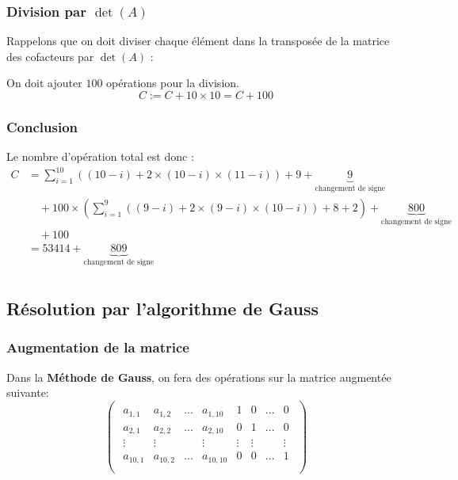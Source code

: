 \documentclass{article}
\begin{document}
\subsubsection{Division par $\det(A)$}

Rappelons que on doit diviser chaque élément dans la transposée de la matrice des cofacteurs par $\det(A)$ :

\begin{tcolorbox}
    On doit ajouter $100$ opérations pour la division.
\[
C := C + 10 \times 10 = C + 100
\]
\end{tcolorbox}

\subsubsection{Conclusion}

\begin{tcolorbox}[title={Conclusion}, fonttitle = \bfseries \sffamily]
    Le nombre d'opération total est donc :
    \begin{align*}
        C &=   
        \sum_{i=1}^{10} ((10-i)+ 2 \times (10-i)\times (11-i)) + 9 + \underbrace{9}_{\text{changement de signe}} \\ &\quad+ 100 \times  \left(\sum_{i=1}^{9} ((9-i) + 2 \times  (9 - i) \times  (10 -i)) + 8+2\right)+ \underbrace{800}_{\text{changement de signe}}\\
        &\quad+ 100 \\
          &= 53414 + \underbrace{809}_{\text{changement de signe}} \\
    \end{align*}
\end{tcolorbox}

\newpage

\subsection{Résolution par l'algorithme de Gauss}

\subsubsection{Augmentation de la matrice}

Dans la \textbf{Méthode de Gauss}, on fera des opérations sur la matrice augmentée suivante:\\

\[
    \begin{pmatrix}  
\begin{array}{cccc|cccc}
a_{1,1} & a_{1,2} & ... & a_{1,10} & 1 &0&... &0\\
a_{2,1} & a_{2,2} & ... & a_{2,10} & 0 &1 & ...&0\\
\vdots & \vdots & & \vdots & \vdots &\vdots & &\vdots\\
a_{10,1} & a_{10,2} & ... & a_{10,10} & 0& 0&... & 1\\
\end{array}\end{pmatrix} 
\]
\end{document}
